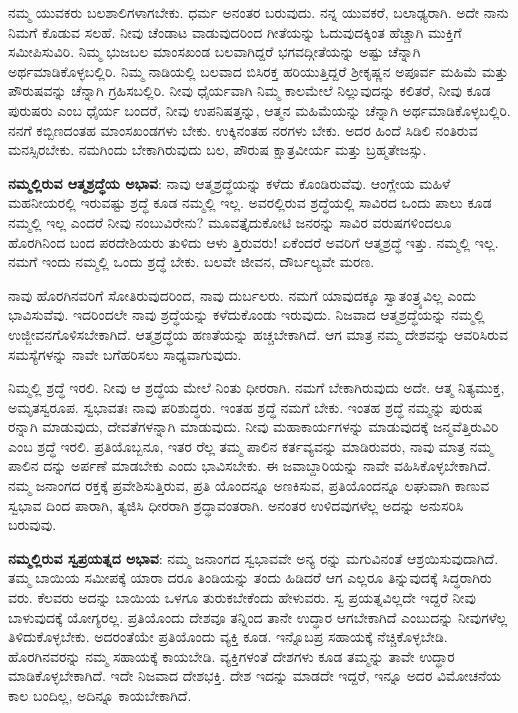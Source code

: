 ನಮ್ಮ ಯುವಕರು ಬಲಶಾಲಿಗಳಾಗಬೇಕು. ಧರ್ಮ ಅನಂತರ ಬರುವುದು. ನನ್ನ ಯುವಕರೆ, ಬಲಾಢ್ಯರಾಗಿ. ಅದೇ ನಾನು ನಿಮಗೆ ಕೊಡುವ ಸಲಹೆ. ನೀವು ಚೆಂಡಾಟ ವಾಡುವುದರಿಂದ ಗೀತೆಯನ್ನು ಓದುವುದಕ್ಕಿಂತ ಹೆಚ್ಚಾಗಿ ಮುಕ್ತಿಗೆ ಸಮೀಪಿಸುವಿರಿ. ನಿಮ್ಮ ಭುಜಬಲ ಮಾಂಸಖಂಡ ಬಲವಾಗಿದ್ದರೆ ಭಗವದ್ಗೀತೆಯನ್ನು ಅಷ್ಟು ಚೆನ್ನಾಗಿ ಅರ್ಥಮಾಡಿಕೊಳ್ಳಬಲ್ಲಿರಿ. ನಿಮ್ಮ ನಾಡಿಯಲ್ಲಿ ಬಲವಾದ ಬಿಸಿರಕ್ತ ಹರಿಯುತ್ತಿದ್ದರೆ ಶ್ರೀಕೃಷ್ಣನ ಅಪೂರ್ವ ಮಹಿಮೆ ಮತ್ತು ಪೌರುಷವನ್ನು ಚೆನ್ನಾಗಿ ಗ್ರಹಿಸಬಲ್ಲಿರಿ. ನೀವು ಧೈರ್ಯವಾಗಿ ನಿಮ್ಮ ಕಾಲಮೇಲೆ ನಿಲ್ಲುವುದನ್ನು ಕಲಿತರೆ, ನೀವು ಕೂಡ ಪುರುಷರು ಎಂಬ ಧೈರ್ಯ ಬಂದರೆ, ನೀವು ಉಪನಿಷತ್ತನ್ನು, ಆತ್ಮನ ಮಹಿಮೆಯನ್ನು ಚೆನ್ನಾಗಿ ಅರ್ಥಮಾಡಿಕೊಳ್ಳಬಲ್ಲಿರಿ. ನನಗೆ ಕಬ್ಬಿಣದಂತಹ ಮಾಂಸಖಂಡಗಳು ಬೇಕು. ಉಕ್ಕಿನಂತಹ ನರಗಳು ಬೇಕು. ಅದರ ಹಿಂದೆ ಸಿಡಿಲಿ ನಂತಿರುವ ಮನಸ್ಸಿರಬೇಕು. ನಮಗಿಂದು ಬೇಕಾಗಿರುವುದು ಬಲ, ಪೌರುಷ ಕ್ಷಾತ್ರವೀರ್ಯ ಮತ್ತು ಬ್ರಹ್ಮತೇಜಸ್ಸು.

\textbf{ನಮ್ಮಲ್ಲಿರುವ ಆತ್ಮಶ್ರದ್ಧೆಯ ಅಭಾವ}: ನಾವು ಆತ್ಮಶ್ರದ್ಧೆಯನ್ನು ಕಳೆದು ಕೊಂಡಿರುವೆವು. ಆಂಗ್ಲೇಯ ಮಹಿಳೆ ಮಹನೀಯರಲ್ಲಿ ಇರುವಷ್ಟು ಶ್ರದ್ಧೆ ಕೂಡ ನಮ್ಮಲ್ಲಿ ಇಲ್ಲ. ಅವರಲ್ಲಿರುವ ಶ್ರದ್ಧೆಯಲ್ಲಿ ಸಾವಿರದ ಒಂದು ಪಾಲು ಕೂಡ ನಮ್ಮಲ್ಲಿ ಇಲ್ಲ ಎಂದರೆ ನೀವು ನಂಬುವಿರೇನು? ಮೂವತ್ತೈದುಕೋಟಿ ಜನರನ್ನು ಸಾವಿರ ವರುಷಗಳಿಂದಲೂ ಹೊರಗಿನಿಂದ ಬಂದ ಪರದೇಶಿಯರು ತುಳಿದು ಆಳು ತ್ತಿರುವರು! ಏಕೆಂದರೆ ಅವರಿಗೆ ಆತ್ಮಶ್ರದ್ಧೆ ಇತ್ತು. ನಮ್ಮಲ್ಲಿ ಇಲ್ಲ. ನಮಗೆ ಇಂದು ನಮ್ಮಲ್ಲಿ ಒಂದು ಶ್ರದ್ಧೆ ಬೇಕು. ಬಲವೇ ಜೀವನ, ದೌರ್ಬಲ್ಯವೇ ಮರಣ.

ನಾವು ಹೊರಗಿನವರಿಗೆ ಸೋತಿರುವುದರಿಂದ, ನಾವು ದುರ್ಬಲರು. ನಮಗೆ ಯಾವುದಕ್ಕೂ ಸ್ವಾತಂತ್ರ್ಯವಿಲ್ಲ ಎಂದು ಭಾವಿಸುವೆವು. ಇದರಿಂದಲೇ ನಾವು ಶ್ರದ್ಧೆಯನ್ನು ಕಳೆದುಕೊಂಡು ಇರುವುದು. ನಿಜವಾದ ಆತ್ಮಶ್ರದ್ಧೆಯನ್ನು ನಮ್ಮಲ್ಲಿ ಉಜ್ಜೀವನಗೊಳಿಸಬೇಕಾಗಿದೆ. ಆತ್ಮಶ್ರದ್ಧೆಯ ಹಣತೆಯನ್ನು ಹಚ್ಚಬೇಕಾಗಿದೆ. ಆಗ ಮಾತ್ರ ನಮ್ಮ ದೇಶವನ್ನು ಆವರಿಸಿರುವ ಸಮಸ್ಯೆಗಳನ್ನು ನಾವೇ ಬಗೆಹರಿಸಲು ಸಾಧ್ಯವಾಗುವುದು.

ನಿಮ್ಮಲ್ಲಿ ಶ್ರದ್ಧೆ ಇರಲಿ. ನೀವು ಆ ಶ್ರದ್ಧೆಯ ಮೇಲೆ ನಿಂತು ಧೀರರಾಗಿ. ನಮಗೆ ಬೇಕಾಗಿರುವುದು ಅದೇ. ಆತ್ಮ ನಿತ್ಯಮುಕ್ತ, ಅಮೃತಸ್ವರೂಪ. ಸ್ವಭಾವತಃ ನಾವು ಪರಿಶುದ್ಧರು. ಇಂತಹ ಶ್ರದ್ಧೆ ನಮಗೆ ಬೇಕು. ಇಂತಹ ಶ್ರದ್ಧೆ ನಮ್ಮನ್ನು ಪುರುಷ ರನ್ನಾಗಿ ಮಾಡುವುದು, ದೇವತೆಗಳನ್ನಾಗಿ ಮಾಡುವುದು. ನೀವು ಮಹಾಕಾರ್ಯಗಳನ್ನು ಮಾಡುವುದಕ್ಕೆ ಜನ್ಮವೆತ್ತಿರುವಿರಿ ಎಂಬ ಶ್ರದ್ಧೆ ಇರಲಿ. ಪ್ರತಿಯೊಬ್ಬನೂ, ಇತರ ರೆಲ್ಲ ತಮ್ಮ ಪಾಲಿನ ಕರ್ತವ್ಯವನ್ನು ಮಾಡಿರುವರು, ನಾವು ಮಾತ್ರ ನಮ್ಮ ಪಾಲಿನ ದನ್ನು ಅರ್ಪಣೆ ಮಾಡಬೇಕು ಎಂದು ಭಾವಿಸಬೇಕು. ಈ ಜವಾಬ್ದಾರಿಯನ್ನು ನಾವೇ ವಹಿಸಿಕೊಳ್ಳಬೇಕಾಗಿದೆ. ನಮ್ಮ ಜನಾಂಗದ ರಕ್ತಕ್ಕೆ ಪ್ರವೇಶಿಸುತ್ತಿರುವ, ಪ್ರತಿ ಯೊಂದನ್ನೂ ಅಣಕಿಸುವ, ಪ್ರತಿಯೊಂದನ್ನೂ ಲಘುವಾಗಿ ಕಾಣುವ ಸ್ವಭಾವ ದಿಂದ ಪಾರಾಗಿ, ತ್ಯಜಿಸಿ ಧೀರರಾಗಿ ಶ್ರದ್ಧಾವಂತರಾಗಿ. ಅನಂತರ ಉಳಿದವುಗಳೆಲ್ಲ ಅದನ್ನು ಅನುಸರಿಸಿ ಬರುವುವು.

\textbf{ನಮ್ಮಲ್ಲಿರುವ ಸ್ವಪ್ರಯತ್ನದ ಅಭಾವ}: ನಮ್ಮ ಜನಾಂಗದ ಸ್ವಭಾವವೇ ಅನ್ಯ ರನ್ನು ಮಗುವಿನಂತೆ ಆಶ್ರಯಿಸುವುದಾಗಿದೆ. ತಮ್ಮ ಬಾಯಿಯ ಸಮೀಪಕ್ಕೆ ಯಾರಾ ದರೂ ತಿಂಡಿಯನ್ನು ತಂದು ಹಿಡಿದರೆ ಆಗ ಎಲ್ಲರೂ ತಿನ್ನುವುದಕ್ಕೆ ಸಿದ್ಧರಾಗಿರು ವರು. ಕೆಲವರು ಅದನ್ನು ಬಾಯಿಯ ಒಳಗೂ ತುರುಕಬೇಕೆಂದು ಹೇಳುವರು. ಸ್ವ ಪ್ರಯತ್ನವಿಲ್ಲದೇ ಇದ್ದರೆ ನೀವು ಬಾಳುವುದಕ್ಕೆ ಯೋಗ್ಯರಲ್ಲ. ಪ್ರತಿಯೊಂದು ದೇಶವೂ ತನ್ನಿಂದ ತಾನೇ ಉದ್ಧಾರ ಆಗಬೇಕಾಗಿದೆ ಎಂಬುದನ್ನು ನೀವುಗಳೆಲ್ಲ ತಿಳಿದುಕೊಳ್ಳಬೇಕು. ಅದರಂತೆಯೇ ಪ್ರತಿಯೊಂದು ವ್ಯಕ್ತಿ ಕೂಡ. ಇನ್ನೊಬಪ್ರ ಸಹಾಯಕ್ಕೆ ನೆಚ್ಚಿಕೊಳ್ಳಬೇಡಿ. ಹೊರಗಿನವರನ್ನು ನಮ್ಮ ಸಹಾಯಕ್ಕೆ ಕಾಯಬೇಡಿ. ವ್ಯಕ್ತಿಗಳಂತೆ ದೇಶಗಳು ಕೂಡ ತಮ್ಮನ್ನು ತಾವೇ ಉದ್ಧಾರ ಮಾಡಿಕೊಳ್ಳಬೇಕಾಗಿದೆ. ಇದೇ ನಿಜವಾದ ದೇಶಭಕ್ತಿ. ದೇಶ ಇದನ್ನು ಮಾಡದೇ ಇದ್ದರೆ, ಇನ್ನೂ ಅದರ ವಿಮೋಚನೆಯ ಕಾಲ ಬಂದಿಲ್ಲ, ಅದಿನ್ನೂ ಕಾಯಬೇಕಾಗಿದೆ.

